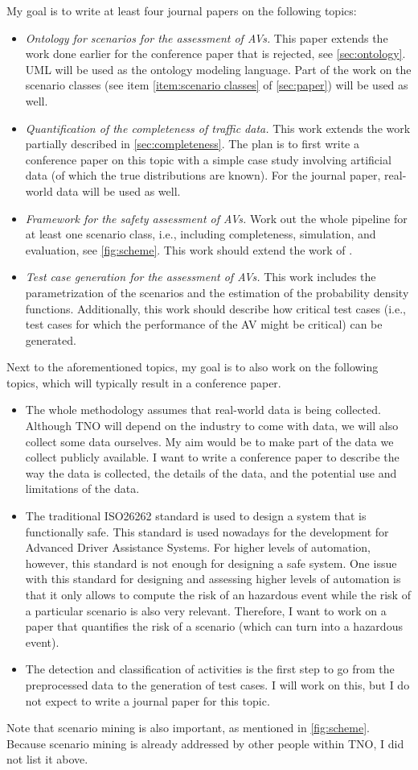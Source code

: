 My goal is to write at least four journal papers on the following topics:
\begin{itemize}
	\item \emph{Ontology for scenarios for the assessment of AVs.} This paper extends the work done earlier for the conference paper that is rejected, see \cref{sec:ontology}. UML will be used as the ontology modeling language. Part of the work on the scenario classes (see item \ref{item:scenario classes} of \cref{sec:paper}) will be used as well.
	\item \emph{Quantification of the completeness of traffic data.} This work extends the work partially described in \cref{sec:completeness}. The plan is to first write a conference paper on this topic with a simple case study involving artificial data (of which the true distributions are known). For the journal paper, real-world data will be used as well.
	\item \emph{Framework for the safety assessment of AVs.} Work out the whole pipeline for at least one scenario class, i.e., including completeness, simulation, and evaluation, see \cref{fig:scheme}. This work should extend the work of \cite{ploeg2018cetran}.
	\item \emph{Test case generation for the assessment of AVs.} This work includes the parametrization of the scenarios and the estimation of the probability density functions. Additionally, this work should describe how critical test cases (i.e., test cases for which the performance of the AV might be critical) can be generated.
\end{itemize}

Next to the aforementioned topics, my goal is to also work on the following topics, which will typically result in a conference paper.
\begin{itemize}
	\item The whole methodology assumes that real-world data is being collected. Although TNO will depend on the industry to come with data, we will also collect some data ourselves. My aim would be to make part of the data we collect publicly available. I want to write a conference paper to describe the way the data is collected, the details of the data, and the potential use and limitations of the data.
	\item The traditional ISO26262 standard is used to design a system that is functionally safe. This standard is used nowadays for the development for Advanced Driver Assistance Systems. For higher levels of automation, however, this standard is not enough for designing a safe system. One issue with this standard for designing and assessing higher levels of automation is that it only allows to compute the risk of an hazardous event while the risk of a particular scenario is also very relevant. Therefore, I want to work on a paper that quantifies the risk of a scenario (which can turn into a hazardous event).
	\item The detection and classification of activities is the first step to go from the preprocessed data to the generation of test cases. I will work on this, but I do not expect to write a journal paper for this topic.
\end{itemize}

Note that scenario mining is also important, as mentioned in \cref{fig:scheme}. Because scenario mining is already addressed by other people within TNO, I did not list it above.
